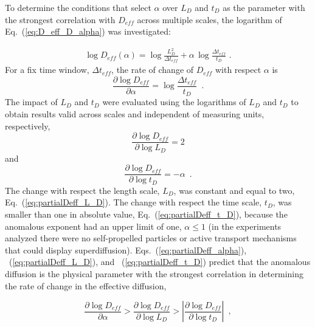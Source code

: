 \documentclass[aps,prl,preprint,superscriptaddress,showkeys,linenumbers]{revtex4-1}
\begin{document}
To determine the conditions \textcolor{Antonio}{that select} $\alpha$ over $L_D$ and $t_D$ \textcolor{Antonio}{as the parameter with the strongest correlation with} $D_{eff}$ across multiple scales, the logarithm of Eq.~(\ref{eq:D_eff_D_alpha}) was investigated:

\begin{align}
   \log D_{eff}(\alpha) = \log \frac{L_D^2}{\Delta t_{eff}} + \alpha \,  \log \frac{\Delta t_{eff}}{t_D} \,\, .
  \label{eq:logDeff_alpha} 
\end{align}
For a fix time window, $\Delta t_{eff}$, the rate of change of $D_{eff}$ with respect $\alpha$ is 
\begin{equation} 
\frac{\partial \log D_{eff}}{\partial \alpha} = \log \frac{\Delta t_{eff}}{t_D} \,\,\, .
\label{eq:partialDeff_alpha}
\end{equation}
The impact of $L_D$ and $t_D$ were evaluated using the logarithms of $L_D$ and $t_D$ to obtain results valid across scales and independent of measuring units, respectively, 
\begin{equation}
\frac{\partial \log D_{eff}}{\partial \log L_D}  = 2
\label{eq:partialDeff_L_D}
\end{equation}
and
\begin{equation}
\frac{\partial \log D_{eff}}{\partial \log t_D}   = -\alpha \,\,\, .
\label{eq:partialDeff_t_D}
\end{equation}
The change with respect the length scale, $L_D$, was constant and equal to two, Eq.~(\ref{eq:partialDeff_L_D}). The change with respect the time scale, $t_D$, was smaller than one in absolute value, Eq.~(\ref{eq:partialDeff_t_D}), because the anomalous exponent had 
an upper limit of one, $\alpha \leq 1$ (in the experiments analyzed there were no self-propelled particles or active transport mechanisms that could display superdiffusion). Eqs.~(\ref{eq:partialDeff_alpha}), ~(\ref{eq:partialDeff_L_D}), and ~(\ref{eq:partialDeff_t_D}) predict that the anomalous diffusion is the \textcolor{Antonio}{physical parameter with the strongest correlation in} determining the rate of change in the effective diffusion,

\begin{equation}
\frac{\partial \log D_{eff}}{\partial \alpha} > \frac{\partial \log D_{eff}}{\partial \log L_D} > \left| \frac{\partial \log D_{eff}}{\partial \log t_D} \right| \,\,\, ,
\label{eq:partial_Deff_ineq}
\end{equation}
\end{document}
